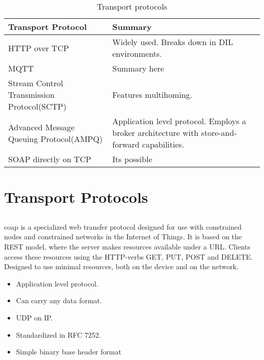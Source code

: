 \begin{table}[h]
\begin{tabularx}{\textwidth}{| X | X |}
\hline
  \textbf{Transport Protocol} & \textbf{Summary} \\ \hline
  HTTP over TCP & Widely used. Breaks down in DIL environments.\\ \hline
  MQTT & Summary here\\ \hline
  Stream Control Transmission Protocol(SCTP) & Features multihoming. \\ \hline
  Advanced Message Queuing Protocol(AMPQ) & Application level protocol. Employs
  a broker architecture with store-and-forward capabilities. \\ \hline
  SOAP directly on TCP & Its possible \\ \hline
\end{tabularx}
\caption{Transport protocols}
\end{table}


\section{Transport Protocols}

\subsection{}

\gls{coap} is a specialized web transfer protocol designed for use with
constrained nodes and constrained networks in the Internet of Things. It is
based on the REST model, where the server makes resources available  under a
URL. Clients access these resources using the HTTP-verbs GET, PUT, POST and
DELETE. Designed to use minimal resources, both on the device and on the
network.

\begin{itemize}
    \item Application level protocol.
    \item Can carry any data format.
    \item UDP on IP.
    \item Standardized in RFC 7252.
    \item Simple binary base header format
\end{itemize}


\subsection{}

